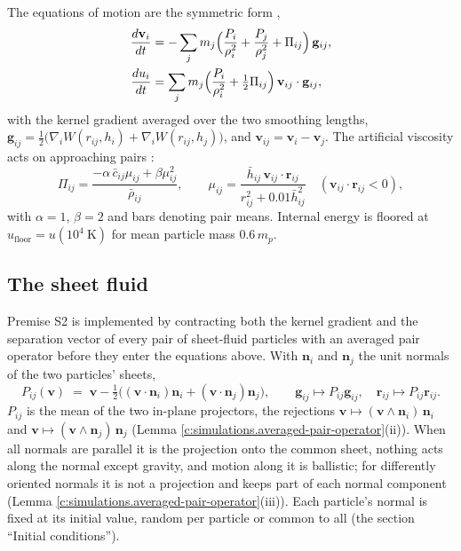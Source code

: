 \documentclass[11pt]{article}
\theoremstyle{definition}
\theoremstyle{plain}
\begin{document}
The equations of motion are the symmetric form \cite{Monaghan1992},
\begin{align*}
\frac{d\mathbf{v}_{i}}{dt} &= -\sum_{j} m_{j}\Bigl(\frac{P_{i}}{\rho_{i}^{2}} + \frac{P_{j}}{\rho_{j}^{2}} + \Pi_{ij}\Bigr)\,\mathbf{g}_{ij},
\\
\frac{du_{i}}{dt} &= \sum_{j} m_{j}\Bigl(\frac{P_{i}}{\rho_{i}^{2}} + \tfrac{1}{2}\Pi_{ij}\Bigr)\,\mathbf{v}_{ij}\cdot\mathbf{g}_{ij},
\end{align*}
with the kernel gradient averaged over the two smoothing lengths, $\mathbf{g}_{ij} = \tfrac{1}{2}\bigl(\nabla_{i}W(r_{ij}, h_{i}) + \nabla_{i}W(r_{ij}, h_{j})\bigr)$, and $\mathbf{v}_{ij} = \mathbf{v}_{i} - \mathbf{v}_{j}$. The artificial viscosity acts on approaching pairs \cite{MonaghanGingold1983}:
\[
\Pi_{ij} = \frac{-\alpha\,\bar{c}_{ij}\mu_{ij} + \beta\mu_{ij}^{2}}{\bar{\rho}_{ij}}, \qquad
\mu_{ij} = \frac{\bar{h}_{ij}\,\mathbf{v}_{ij}\cdot\mathbf{r}_{ij}}{r_{ij}^{2} + 0.01\bar{h}_{ij}^{2}} \quad (\mathbf{v}_{ij}\cdot\mathbf{r}_{ij} < 0),
\]
with $\alpha = 1$, $\beta = 2$ and bars denoting pair means. Internal energy is floored at $u_{\mathrm{floor}} = u(10^{4}\ \mathrm{K})$ for mean particle mass $0.6\,m_{p}$.

\subsection*{The sheet fluid}
\label{c:note.simulations.setting-sheet-fluid}
Premise S2 is implemented by contracting both the kernel gradient and the separation vector of every pair of sheet-fluid particles with an averaged pair operator before they enter the equations above. With $\mathbf{n}_{i}$ and $\mathbf{n}_{j}$ the unit normals of the two particles' sheets,
\begin{equation}
P_{ij}(\mathbf{v}) \;=\; \mathbf{v} - \tfrac{1}{2}\bigl((\mathbf{v}\cdot\mathbf{n}_{i})\mathbf{n}_{i} + (\mathbf{v}\cdot\mathbf{n}_{j})\mathbf{n}_{j}\bigr),
\qquad
\mathbf{g}_{ij} \mapsto P_{ij}\mathbf{g}_{ij}, \quad \mathbf{r}_{ij} \mapsto P_{ij}\mathbf{r}_{ij}.
\end{equation}
$P_{ij}$ is the mean of the two in-plane projectors, the rejections $\mathbf{v} \mapsto (\mathbf{v}\wedge\mathbf{n}_{i})\,\mathbf{n}_{i}$ and $\mathbf{v} \mapsto (\mathbf{v}\wedge\mathbf{n}_{j})\,\mathbf{n}_{j}$ (Lemma \ref{c:simulations.averaged-pair-operator}(ii)). When all normals are parallel it is the projection onto the common sheet, nothing acts along the normal except gravity, and motion along it is ballistic; for differently oriented normals it is not a projection and keeps part of each normal component (Lemma \ref{c:simulations.averaged-pair-operator}(iii)). Each particle's normal is fixed at its initial value, random per particle or common to all (the section ``Initial conditions'').
\end{document}
